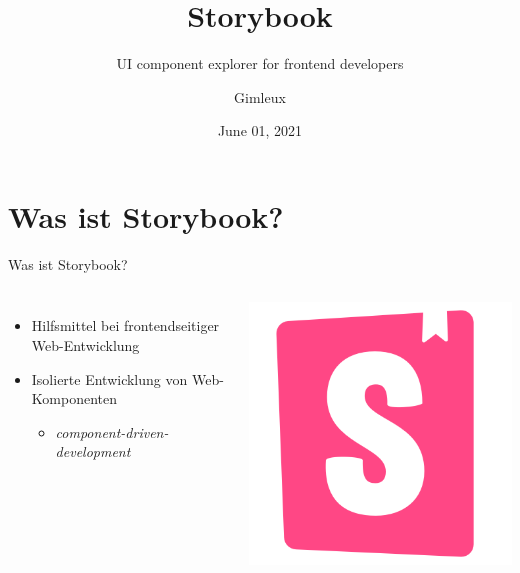 \documentclass{beamer}
\title{Storybook}
\subtitle{UI component explorer for frontend developers}
\author{Gimleux}
\institute{Software Engineering}
\date{June 01, 2021}
\begin{document}

\begin{frame}
	\maketitle %
\end{frame}


\section{Was ist Storybook?} %

\begin{frame}{Was ist Storybook?}
	\begin{columns}
		\begin{itemize}
			\item Hilfsmittel bei frontendseitiger Web-Entwicklung
			\item Isolierte Entwicklung von Web-Komponenten
			\begin{itemize}
				\item \emph{component-driven-development}
			\end{itemize}
		\end{itemize}
		
		\includegraphics[width=\linewidth]{Images/storybook_logo.png}
	\end{columns}
\end{frame}
\end{document}
